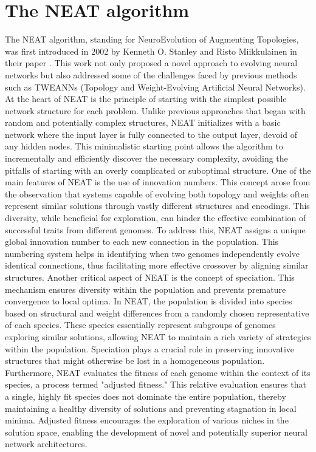 \documentclass{article}
\begin{document}
\section {The NEAT algorithm}
The NEAT algorithm, standing for NeuroEvolution of Augmenting Topologies, was first introduced in 2002 by Kenneth O. Stanley
and Risto Miikkulainen in their paper \cite{originalNeat}. This work not only proposed a novel approach to evolving neural
networks but also addressed some of the challenges faced by previous methods such as TWEANNs (Topology and Weight-Evolving
Artificial Neural Networks).
At the heart of NEAT is the principle of starting with the simplest possible network structure for each problem. Unlike previous
approaches that began with random and potentially complex structures, NEAT initializes with a basic network where the input
layer is fully connected to the output layer, devoid of any hidden nodes. This minimalistic starting point allows the algorithm
to incrementally and efficiently discover the necessary complexity, avoiding the pitfalls of starting with an overly complicated or suboptimal structure.
One of the main features of NEAT is the use of innovation numbers. This concept arose from the observation that systems
capable of evolving both topology and weights often represent similar solutions through vastly different structures and encodings.
This diversity, while beneficial for exploration, can hinder the effective combination of successful traits from different genomes.
To address this, NEAT assigns a unique global innovation number to each new connection in the population. This numbering system helps 
in identifying when two genomes independently evolve identical connections, thus facilitating more effective crossover by aligning similar structures.
Another critical aspect of NEAT is the concept of speciation. This mechanism ensures diversity within the population and prevents
premature convergence to local optima. In NEAT, the population is divided into species based on structural and weight differences
from a randomly chosen representative of each species. These species essentially represent subgroups of genomes exploring similar 
solutions, allowing NEAT to maintain a rich variety of strategies within the population. Speciation plays a crucial role in preserving
innovative structures that might otherwise be lost in a homogeneous population.
Furthermore, NEAT evaluates the fitness of each genome within the context of its species, a process termed "adjusted fitness."
This relative evaluation ensures that a single, highly fit species does not dominate the entire population, thereby maintaining
a healthy diversity of solutions and preventing stagnation in local minima. Adjusted fitness encourages the exploration
of various niches in the solution space, enabling the development of novel and potentially superior neural network architectures.
\end{document}
